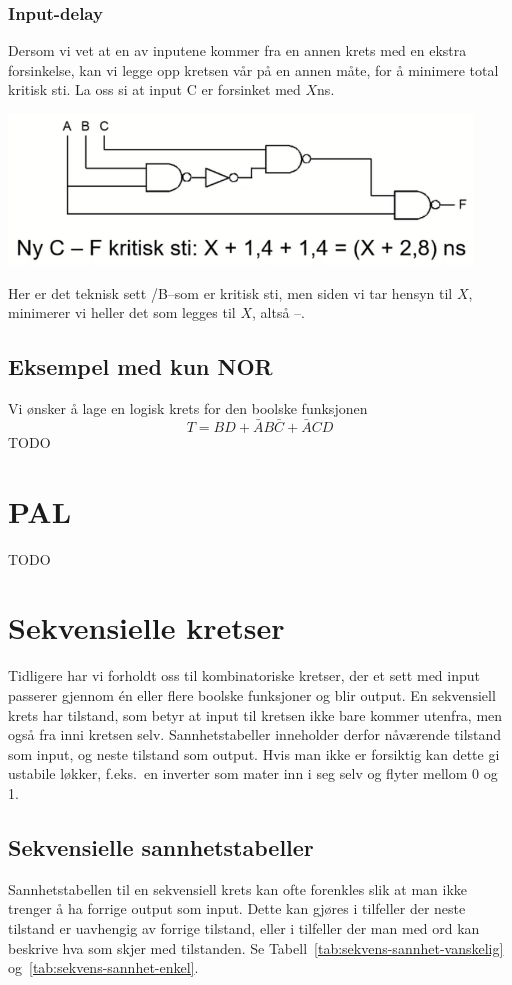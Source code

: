 \documentclass[12pt,a4paper,norsk]{article}
\begin{document}
\subsubsection{Input-delay}
Dersom vi vet at en av inputene kommer fra en annen krets med en ekstra forsinkelse,
kan vi legge opp kretsen vår på en annen måte, for å minimere total kritisk sti. La oss si
at input C er forsinket med $X$\si{\nano\second}.
\begin{center}
  \includegraphics[height=4cm,keepaspectratio]{Krets_CTeknomap}
\end{center}
Her er det teknisk sett \@A/B\@--\@F som er kritisk sti, men siden vi tar hensyn til
$X$, minimerer vi heller det som legges til $X$, altså \@C\@--\@F\@.

\subsection{Eksempel med kun NOR}
Vi ønsker å lage en logisk krets for den boolske funksjonen
\[T = BD + \bar{A}B\bar{C} + \bar{A}CD\]
TODO

\section{PAL}
TODO

\section{Sekvensielle kretser}
Tidligere har vi forholdt oss til kombinatoriske kretser, der et sett med input
passerer gjennom én eller flere boolske funksjoner og blir output. En sekvensiell
krets har tilstand, som betyr at input til kretsen ikke bare kommer utenfra, men
også fra inni kretsen selv. Sannhetstabeller inneholder derfor nåværende tilstand
som input, og neste tilstand som output. Hvis man ikke er forsiktig kan dette gi
ustabile løkker, f.eks.\ en inverter som mater inn i seg selv og flyter mellom 0
og 1.

\subsection{Sekvensielle sannhetstabeller}
Sannhetstabellen til en sekvensiell krets kan ofte forenkles slik at man ikke
trenger å ha forrige output som input. Dette kan gjøres i tilfeller der neste
tilstand er uavhengig av forrige tilstand, eller i tilfeller der man med ord kan
beskrive hva som skjer med tilstanden. Se
Tabell~\ref{tab:sekvens-sannhet-vanskelig} og~\ref{tab:sekvens-sannhet-enkel}.
\end{document}
